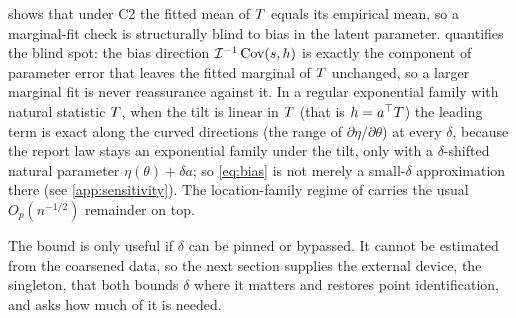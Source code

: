 \begin{remark}
\citet{towell2026synthesis} shows that under C2 the fitted mean of $T$ equals its
empirical mean, so a marginal-fit check is structurally blind to bias in the latent
parameter.  quantifies the blind spot: the bias direction
$\mathcal{I}^{-1}\operatorname{Cov}(s, h)$ is exactly the component of parameter error that leaves the
fitted marginal of $T$ unchanged, so a larger marginal fit is never reassurance
against it. In a regular exponential family with natural statistic $T$, when the
tilt is linear in $T$ (that is $h = a^\top T$) the leading term is exact along the
curved directions (the range of $\partial \eta / \partial \theta$) at every $\delta$,
because the report law stays an exponential family under the tilt, only with a
$\delta$-shifted natural parameter $\eta(\theta) + \delta a$; so \eqref{eq:bias} is
not merely a small-$\delta$ approximation there (see \cref{app:sensitivity}). The
location-family regime of \citet{towell2026synthesis} carries the usual
$O_p(n^{-1/2})$ remainder on top.
\end{remark}

The bound is only useful if $\delta$ can be pinned or bypassed. It cannot be
estimated from the coarsened data, so the next section supplies the external
device, the singleton, that both bounds $\delta$ where it matters and restores point
identification, and asks how much of it is needed.
